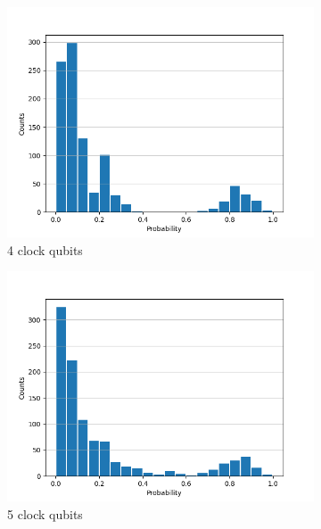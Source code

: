 \documentclass[12pt]{extarticle}
\begin{document}
\begin{figure}[htbp]
    \centering
    \captionsetup[subfigure]{labelformat=empty}
    \begin{subfigure}[b]{0.45\textwidth}
        \centering
        \includegraphics[width=\textwidth]{images/ancilla_frequency_dist_8x8b4.png}
        \caption{4 clock qubits}
    \end{subfigure}
    \hfill
    \begin{subfigure}[b]{0.45\textwidth}
        \centering
        \includegraphics[width=\textwidth]{images/ancilla_frequency_dist_8x8b5.png}
        \caption{5 clock qubits}
    \end{subfigure}
    \vfill
    \begin{subfigure}[b]{0.45\textwidth}

\end{subfigure}
\end{figure}
\end{document}
